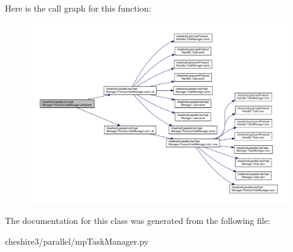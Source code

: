 Here is the call graph for this function\-:
\nopagebreak
\begin{figure}[H]
\begin{center}
\leavevmode
\includegraphics[width=350pt]{classcheshire3_1_1parallel_1_1mp_task_manager_1_1_process_task_manager_a536127426588621d1202946cbcb2d21c_cgraph}
\end{center}
\end{figure}




The documentation for this class was generated from the following file\-:\begin{DoxyCompactItemize}
\item 
cheshire3/parallel/mp\-Task\-Manager.\-py\end{DoxyCompactItemize}
